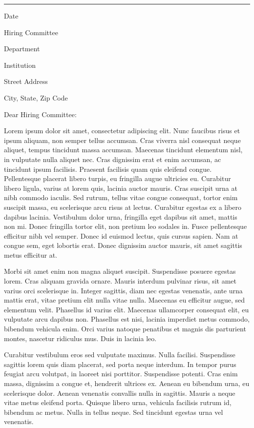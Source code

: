 \documentclass[12pt]{article}
\begin{document}
\vspace{0.5cm}
\hrule
\vspace{0.5cm}
\setlength{\parindent}{0pt}
\setlength{\headsep}{0.6in}

Date
\bigskip

Hiring Committee

Department

Institution

Street Address

City, State, Zip Code
\bigskip

Dear Hiring Committee: \bigskip 

Lorem ipsum dolor sit amet, consectetur adipiscing elit. Nunc faucibus risus et
ipsum aliquam, non semper tellus accumsan. Cras viverra nisl consequat neque
aliquet, tempus tincidunt massa accumsan. Maecenas tincidunt elementum nisl, in
vulputate nulla aliquet nec. Cras dignissim erat et enim accumsan, ac tincidunt
ipsum facilisis. Praesent facilisis quam quis eleifend congue. Pellentesque
placerat libero turpis, eu fringilla augue ultricies eu. Curabitur libero
ligula, varius at lorem quis, lacinia auctor mauris. Cras suscipit urna at nibh
commodo iaculis. Sed rutrum, tellus vitae congue consequat, tortor enim suscipit
massa, eu scelerisque arcu risus at lectus. Curabitur egestas ex a libero
dapibus lacinia. Vestibulum dolor urna, fringilla eget dapibus sit amet, mattis
non mi. Donec fringilla tortor elit, non pretium leo sodales in. Fusce
pellentesque efficitur nibh vel semper. Donec id euismod lectus, quis cursus
sapien. Nam at congue sem, eget lobortis erat. Donec dignissim auctor mauris,
sit amet sagittis metus efficitur at. \bigskip 

Morbi sit amet enim non magna aliquet suscipit. Suspendisse posuere egestas
lorem. Cras aliquam gravida ornare. Mauris interdum pulvinar risus, sit amet
varius orci scelerisque in. Integer sagittis, diam nec egestas venenatis, ante
urna mattis erat, vitae pretium elit nulla vitae nulla. Maecenas eu efficitur
augue, sed elementum velit. Phasellus id varius elit. Maecenas ullamcorper
consequat elit, eu vulputate arcu dapibus non. Phasellus est nisi, lacinia
imperdiet metus commodo, bibendum vehicula enim. Orci varius natoque penatibus
et magnis dis parturient montes, nascetur ridiculus mus. Duis in lacinia
leo. \bigskip 

Curabitur vestibulum eros sed vulputate maximus. Nulla facilisi. Suspendisse sagittis lorem quis diam placerat, sed porta neque interdum. In tempor purus feugiat arcu volutpat, in laoreet nisi porttitor. Suspendisse potenti. Cras enim massa, dignissim a congue et, hendrerit ultrices ex. Aenean eu bibendum urna, eu scelerisque dolor. Aenean venenatis convallis nulla in sagittis. Mauris a neque vitae metus eleifend porta. Quisque libero urna, vehicula facilisis rutrum id, bibendum ac metus. Nulla in tellus neque. Sed tincidunt egestas urna vel venenatis.
\end{document}
